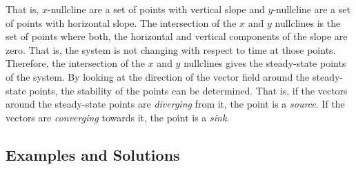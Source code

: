 \documentclass[11pt,1in]{article}
\begin{document}
That is, $x$-nullcline are a set of points with vertical slope and $y$-nullcline are a set of points with horizontal slope. The intersection of the $x$ and $y$ nullclines is the set of points where both, the horizontal and vertical components of the slope are zero. That is, the system is not changing with respect to time at those points. Therefore, the intersection of the $x$ and $y$ nullclines gives the steady-state points of the system. By looking at the direction of the vector field around the steady-state points, the stability of the points can be determined. That is, if the vectors around the steady-state points are \emph{diverging} from it, the point is a \emph{source}. If the vectors are \emph{converging} towards it, the point is a \emph{sink}.  
\subsection{Examples and Solutions}
\end{document}
